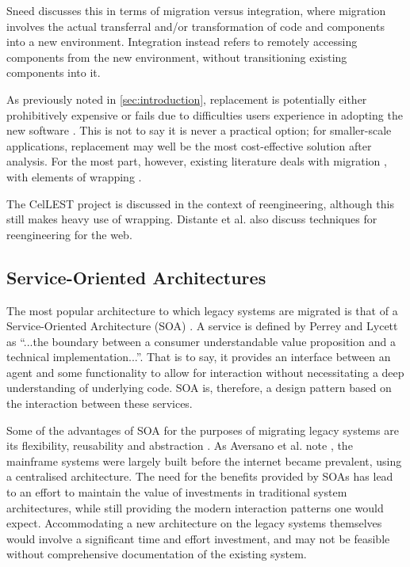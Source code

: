 \documentclass[12pt,journal,compsoc]{IEEEtran}
\begin{document}
Sneed \cite{Sneed2009} discusses this in terms of migration versus integration, where migration involves the actual transferral and/or transformation of code and components into a new environment. Integration instead refers to remotely accessing components from the new environment, without transitioning existing components into it.

As previously noted in \autoref{sec:introduction}, replacement is potentially either prohibitively expensive \cite{Duncan1996} or fails due to difficulties users experience in adopting the new software \cite{Sneed2011}. This is not to say it is never a practical option; for smaller-scale applications, replacement may well be the most cost-effective solution after analysis. For the most part, however, existing literature deals with migration \cite{Aversano2001,Bodhuin2002,Canfora2006,Canfora2000,Canfora2008,Lucia1997,Lewis2006,Sneed2011,Sneed2008,Sneed2009,Sneed2013,Wu2005,Sneed1996,Duncan1996}, with elements of wrapping \cite{Chiang2001,Canfora2008,Sneed1996,Sneed2003}.

The CelLEST project \cite{Stroulia2002} is discussed in the context of reengineering, although this still makes heavy use of wrapping. Distante et al. \cite{Distante2006} also discuss techniques for reengineering for the web.

\subsection{Service-Oriented Architectures}
\label{subsec:soa}
The most popular architecture to which legacy systems are migrated is that of a Service-Oriented Architecture (SOA) \cite{Sneed2008,Almonaies2010,Koschel2009,Canfora2006,Sneed2009,Canfora2008}. A service is defined by Perrey and Lycett \cite{Perrey2003} as ``...the boundary between a consumer understandable value proposition and a technical implementation...''. That is to say, it provides an interface between an agent and some functionality to allow for interaction without necessitating a deep understanding of underlying code. SOA is, therefore, a design pattern based on the interaction between these services.

Some of the advantages of SOA for the purposes of migrating legacy systems are its flexibility, reusability and abstraction \cite{Almonaies2010}. As Aversano et al. note \cite{Aversano2001}, the mainframe systems were largely built before the internet became prevalent, using a centralised architecture. The need for the benefits provided by SOAs has lead to an effort to maintain the value of investments in traditional system architectures, while still providing the modern interaction patterns one would expect. Accommodating a new architecture on the legacy systems themselves would involve a significant time and effort investment, and may not be feasible without comprehensive documentation of the existing system.
\end{document}
